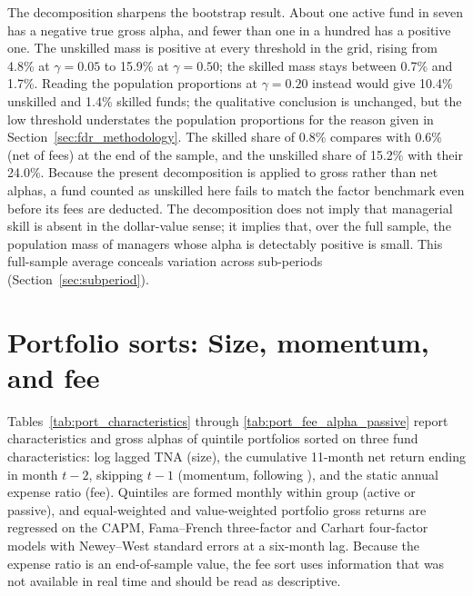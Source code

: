 \documentclass[12pt, oneside]{report}
\begin{document}


The decomposition sharpens the bootstrap result. About one active fund in
seven has a negative true gross alpha, and fewer than one in a hundred has a
positive one. The unskilled mass is positive at every threshold in the
grid, rising from 4.8\% at $\gamma = 0.05$ to 15.9\% at $\gamma = 0.50$;
the skilled mass stays between 0.7\% and 1.7\%. Reading the population
proportions at $\gamma = 0.20$ instead would give 10.4\% unskilled and 1.4\% skilled funds; the
qualitative conclusion is unchanged, but the low threshold understates
the population proportions for the reason given in
Section~\ref{sec:fdr_methodology}. The skilled share of 0.8\% compares
with 0.6\% (net of fees) at the end of the
\textcite{BarrasScailletWermers2010} sample,
and the unskilled share of 15.2\% with their 24.0\%. Because the present
decomposition is applied to gross rather than net alphas, a fund counted
as unskilled here fails to match the factor benchmark even before its
fees are deducted. The decomposition does not imply that managerial skill
is absent in the \textcite{BerkVanBinsbergen2015} dollar-value sense; it
implies that, over the full sample, the population mass of managers whose
alpha is detectably positive is small. This full-sample average conceals
variation across sub-periods (Section~\ref{sec:subperiod}).

\section{Portfolio sorts: Size, momentum, and fee}
\label{sec:portfolio_sorts}

\noindent Tables~\ref{tab:port_characteristics} through
\ref{tab:port_fee_alpha_passive} report characteristics and gross alphas of
quintile portfolios sorted on three fund characteristics: log lagged TNA
(size), the cumulative 11-month net return ending in month $t-2$,
skipping $t-1$ (momentum, following \textcite{JegadeeshTitman1993}), and
the static annual expense ratio (fee). Quintiles are formed monthly within
group (active or passive), and equal-weighted and value-weighted portfolio
gross returns are regressed on the CAPM, Fama--French three-factor and
Carhart four-factor models with Newey--West standard errors at a
six-month lag. Because the expense ratio is an end-of-sample value, the
fee sort uses information that was not available in real time and should
be read as descriptive.


\end{document}
